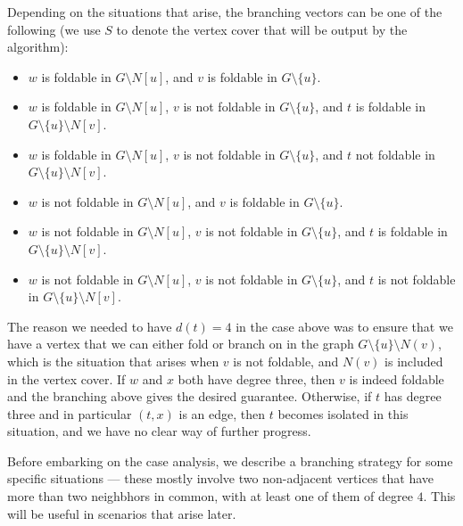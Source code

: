 \documentclass[svgnames]{llncs}
\newcommand{\branchvector}[1]{{\color{IndianRed}{$(#1)$}}}
\begin{document}
{\begin{enumerate}[series=main,label=\bfseries Case~\arabic*:]
Depending on the situations that arise, the branching vectors can be one of the following (we use $S$ to denote the vertex cover that will be output by the algorithm):

\begin{itemize}
\item $w$ is foldable in $G \setminus N[u]$, and $v$ is foldable in $G \setminus \{u\}$. \branchvector{2,5}
\item $w$ is foldable in $G \setminus N[u]$, $v$ is not foldable in $G \setminus \{u\}$, and $t$ is foldable in $G \setminus \{u\} \setminus N[v]$. \branchvector{7,4,5}
\item $w$ is foldable in $G \setminus N[u]$, $v$ is not foldable in $G \setminus \{u\}$, and $t$ not foldable in $G \setminus \{u\} \setminus N[v]$. \branchvector{7,9,5,5}
\item $w$ is not foldable in $G \setminus N[u]$, and $v$ is foldable in $G \setminus \{u\}$. \branchvector{2,10,6}
\item $w$ is not foldable in $G \setminus N[u]$, $v$ is not foldable in $G \setminus \{u\}$, and $t$ is foldable in $G \setminus \{u\} \setminus N[v]$. \branchvector{7,4,10,6}
\item $w$ is not foldable in $G \setminus N[u]$, $v$ is not foldable in $G \setminus \{u\}$, and $t$ is not foldable in $G \setminus \{u\} \setminus N[v]$. \branchvector{7,9,5,10,6}
\end{itemize}

\end{enumerate}

The reason we needed to have $d(t) = 4$ in the case above was to ensure that we have a vertex that we can either fold or branch on in the graph $G \setminus \{u\} \setminus N(v)$, which is the situation that arises
when $v$ is not foldable, and $N(v)$ is included in the vertex cover. If $w$ and $x$ both have degree three, then $v$ is indeed foldable and the branching above gives the desired guarantee. 
Otherwise, if $t$ has degree three and in particular $(t,x)$ is an edge, then $t$ becomes isolated in this situation, and we have no clear way of further progress. 
}

Before embarking on the case analysis, we describe a branching strategy for some specific situations --- these mostly involve two non-adjacent vertices that
have more than two neighbhors in common, with at least one of them of degree $4$. This will be useful in scenarios that arise later. 
\end{document}
